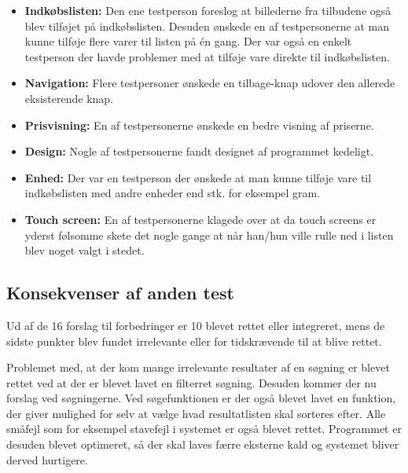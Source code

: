 \begin{itemize}
\item \textbf{Indkøbslisten:}
Den ene testperson foreslog at billederne fra tilbudene også blev tilføjet på indkøbslisten. Desuden ønskede en af testpersonerne at man kunne tilføje flere varer til listen på én gang. Der var også en enkelt testperson der havde problemer med at tilføje vare direkte til indkøbslisten.


\item \textbf{Navigation:}
Flere testpersoner ønskede en tilbage-knap udover den allerede eksisterende  knap.


\item \textbf{Prisvisning:}
En af testpersonerne ønskede en bedre visning af priserne.


\item \textbf{Design:}
Nogle af testpersonerne fandt designet af programmet kedeligt. 




\item \textbf{Enhed:}
Der var en testperson der ønskede at man kunne tilføje vare til indkøbslisten med andre enheder end stk. for eksempel gram. 

\item \textbf{Touch screen:}
En af testpersonerne klagede over at da touch screens er yderst følsomme skete det nogle gange at når han/hun ville rulle ned i listen blev noget valgt i stedet. 

\end{itemize}

\subsection{Konsekvenser af anden test}
Ud af de 16 forslag til forbedringer er 10 blevet rettet eller integreret, mens de sidste punkter blev fundet irrelevante eller for tidskrævende til at blive rettet.


Problemet med, at der kom mange irrelevante resultater af en søgning er blevet rettet ved at der er blevet lavet en filterret søgning. Desuden kommer der nu forslag ved søgningerne. Ved søgefunktionen er der også blevet lavet en funktion, der giver mulighed for selv at vælge hvad resultatlisten skal sorteres efter. Alle småfejl som for eksempel stavefejl i systemet er også blevet rettet.
Programmet er desuden blevet optimeret, så der skal laves færre eksterne kald og systemet bliver derved hurtigere.


